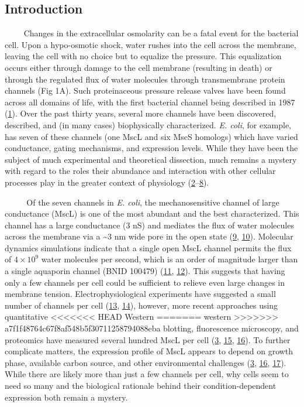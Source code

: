 \subsection{Introduction}\label{introduction}

~~~~
Changes
in the
extracellular
osmolarity
can be
a
fatal
event
for
the
bacterial
cell.
Upon a
hypo-osmotic
shock,
water
rushes
into
the
cell
across
the
membrane,
leaving
the
cell
with
no
choice
but to
equalize
the
pressure.
This
equalization
occurs
either
through
damage
to the
cell
membrane
(resulting
in
death)
or
through
the
regulated
flux
of
water
molecules
through
transmembrane
protein
channels
(Fig
1A).
Such
proteinaceous
pressure
release
valves
have
been
found
across
all
domains
of
life,
with
the
first
bacterial
channel
being
described
in
1987
(\protect\hyperlink{ref-martinac1987}{1}).
Over
the
past
thirty
years,
several
more
channels
have
been
discovered,
described,
and
(in
many
cases)
biophysically
characterized.
\emph{E.
coli},
for
example,
has
seven
of
these
channels
(one
MscL
and
six
MscS
homologs)
which
have
varied
conductance,
gating
mechanisms,
and
expression
levels.
While
they
have
been
the
subject
of
much
experimental
and
theoretical
dissection,
much
remains
a
mystery
with
regard
to the
roles
their
abundance
and
interaction
with
other
cellular
processes
play
in the
greater
context
of
physiology
(\protect\hyperlink{ref-bavi2016}{2}--\protect\hyperlink{ref-vandenberg2016}{8}).

~~ ~
~Of
the
seven
channels
in
\emph{E.
coli},
the
mechanosensitive
channel
of
large
conductance
(MscL)
is one
of the
most
abundant
and
the
best
characterized.
This
channel
has a
large
conductance
(3 nS)
and
mediates
the
flux
of
water
molecules
across
the
membrane
via a
\textasciitilde{}3
nm
wide
pore
in the
open
state
(\protect\hyperlink{ref-cruickshank1997}{9},
\protect\hyperlink{ref-haswell2011}{10}).
Molecular
dynamics
simulations
indicate
that a
single
open
MscL
channel
permits
the
flux
of
\(4 \times 10^9\)
water
molecules
per
second,
which
is an
order
of
magnitude
larger
than a
single
aquaporin
channel
(BNID
100479)
(\protect\hyperlink{ref-louhivuori2010}{11},
\protect\hyperlink{ref-milo2010}{12}).
This
suggests
that
having
only a
few
channels
per
cell
could
be
sufficient
to
relieve
even
large
changes
in
membrane
tension.
Electrophysiological
experiments
have
suggested
a
small
number
of
channels
per
cell
(\protect\hyperlink{ref-booth2005}{13},
\protect\hyperlink{ref-hase1997}{14}),
however,
more
recent
approaches
using
quantitative
<<<<<<< HEAD
Western
=======
western
>>>>>>> a7f1f48764c67f8af548b5f30711258794088eba
blotting,
fluorescence
microscopy,
and
proteomics
have
measured
several
hundred
MscL
per
cell
(\protect\hyperlink{ref-bialecka-fornal2012}{3},
\protect\hyperlink{ref-schmidt2016}{15},
\protect\hyperlink{ref-soufi2015}{16}).
To
further
complicate
matters,
the
expression
profile
of
MscL
appears
to
depend
on
growth
phase,
available
carbon
source,
and
other
environmental
challenges
(\protect\hyperlink{ref-bialecka-fornal2012}{3},
\protect\hyperlink{ref-soufi2015}{16},
\protect\hyperlink{ref-stokes2003a}{17}).
While
there
are
likely
more
than
just a
few
channels
per
cell,
why
cells
seem
to
need
so
many
and
the
biological
rationale
behind
their
condition-dependent
expression
both
remain
a
mystery.

